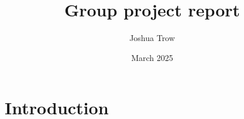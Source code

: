 \documentclass{article}
\title{Group project report}
\author{Joshua Trow}
\date{March 2025}
\begin{document}
\maketitle

\section{Introduction}
\end{document}
